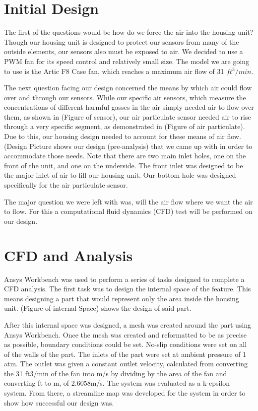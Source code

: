 \section{Initial Design}

The first of the questions would be how do we force the air into the housing unit? Though our housing unit is designed to protect our sensors from many of the outside elements, our sensors also must be exposed to air. We decided to use a PWM fan for its speed control and relatively small size. The model we are going to use is the Artic F8 Case fan, which reaches a maximum air flow of 31 $ft^{3}/min$.

The next question facing our design concerned the means by which air could flow over and through our sensors. While our specific air sensors, which measure the concentrations of different harmful gasses in the air simply needed air to flow over them, as shown in (Figure of sensor), our air particulate sensor needed air to rise through a very specific segment, as demonstrated in (Figure of air particulate). Due to this, our housing design needed to account for these means of air flow. (Design Picture shows our design (pre-analysis) that we came up with in order to accommodate those needs. Note that there are two main inlet holes, one on the front of the unit, and one on the underside. The front inlet was designed to be the major inlet of air to fill  our housing unit. Our bottom hole was designed specifically for the air particulate sensor.

The major question we were left with was, will the air flow where we want the air to flow. For this a computational fluid dynamics (CFD) test will be performed on our design.

\section{CFD and Analysis}

Ansys Workbench was used to perform a series of tasks designed to complete a CFD analysis. The first task was to design the internal space of the feature. This means designing a part that would represent only the area inside the housing unit. (Figure of internal Space) shows the design of said part.

After this internal space was designed, a mesh was created around the part using Ansys Workbench. Once the mesh was created and reformatted to be as precise as possible, boundary conditions could be set. No-slip conditions were set on all of the walls of the part. The inlets of the part were set at ambient pressure of 1 atm. The outlet was given a constant outlet velocity, calculated from converting the 31 ft3/min of the fan into m/s by dividing by the area of the fan and converting ft to m, of 2.6058m/s. The system was evaluated as a k-epsilon system. From there, a streamline map was developed for the system in order to show how successful our design was.

